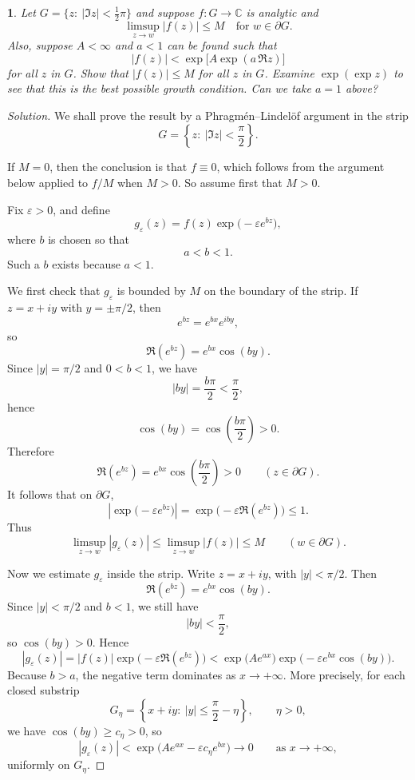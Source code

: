 \documentclass[12pt, a4paper]{report}
\theoremstyle{spaced}
\newtheorem{exercise}{}
\newcommand{\setexercise}[1]{\setcounter{exercise}{#1-1}}
\begin{document}
\setexercise{3}
\begin{exercise}
	Let $G=\{z:\ |\Im z|<\tfrac{1}{2}\pi\}$ and suppose $f:G\to\mathbb{C}$ is analytic and
	\[
		\limsup_{z\to w}|f(z)|\le M \quad \text{for } w\in \partial G.
	\]
	Also, suppose $A<\infty$ and $a<1$ can be found such that
	\[
		|f(z)|<\exp\!\bigl[A\exp(a\,\Re z)\bigr]
	\]
	for all $z$ in $G$. Show that $|f(z)|\le M$ for all $z$ in $G$.
	Examine $\exp(\exp z)$ to see that this is the best possible growth condition.
	Can we take $a=1$ above?
\end{exercise}
\begin{proof}[Solution]
	We shall prove the result by a Phragm\'en--Lindel\"of argument in the strip
	\[
		G=\left\{z:\ |\Im z|<\frac{\pi}{2}\right\}.
	\]

	If \(M=0\), then the conclusion is that \(f\equiv 0\), which follows from the argument below applied to \(f/M\) when \(M>0\). So assume first that \(M>0\).

	Fix \(\varepsilon>0\), and define
	\[
		g_\varepsilon(z)=f(z)\exp\!\bigl(-\varepsilon e^{bz}\bigr),
	\]
	where \(b\) is chosen so that
	\[
		a<b<1.
	\]
	Such a \(b\) exists because \(a<1\).

	We first check that \(g_\varepsilon\) is bounded by \(M\) on the boundary of the strip.
	If \(z=x+iy\) with \(y=\pm \pi/2\), then
	\[
		e^{bz}=e^{bx}e^{iby},
	\]
	so
	\[
		\Re(e^{bz})=e^{bx}\cos(by).
	\]
	Since \(|y|=\pi/2\) and \(0<b<1\), we have
	\[
		|by|=\frac{b\pi}{2}<\frac{\pi}{2},
	\]
	hence
	\[
		\cos(by)=\cos\!\left(\frac{b\pi}{2}\right)>0.
	\]
	Therefore
	\[
		\Re(e^{bz})=e^{bx}\cos\!\left(\frac{b\pi}{2}\right)>0
		\qquad (z\in \partial G).
	\]
	It follows that on \(\partial G\),
	\[
		\left|\exp\!\bigl(-\varepsilon e^{bz}\bigr)\right|
		=\exp\!\bigl(-\varepsilon \Re(e^{bz})\bigr)\le 1.
	\]
	Thus
	\[
		\limsup_{z\to w}|g_\varepsilon(z)|
		\le \limsup_{z\to w}|f(z)|
		\le M
		\qquad (w\in \partial G).
	\]

	Now we estimate \(g_\varepsilon\) inside the strip. Write \(z=x+iy\), with \(|y|<\pi/2\). Then
	\[
		\Re(e^{bz})=e^{bx}\cos(by).
	\]
	Since \(|y|<\pi/2\) and \(b<1\), we still have
	\[
		|by|<\frac{\pi}{2},
	\]
	so \(\cos(by)>0\). Hence
	\[
		|g_\varepsilon(z)|
		=
		|f(z)|\exp\!\bigl(-\varepsilon \Re(e^{bz})\bigr)
		<
		\exp\!\bigl(Ae^{ax}\bigr)\exp\!\bigl(-\varepsilon e^{bx}\cos(by)\bigr).
	\]
	Because \(b>a\), the negative term dominates as \(x\to +\infty\). More precisely, for each closed substrip
	\[
		G_\eta=\left\{x+iy:\ |y|\le \frac{\pi}{2}-\eta\right\},
		\qquad \eta>0,
	\]
	we have \(\cos(by)\ge c_\eta>0\), so
	\[
		|g_\varepsilon(z)|
		<
		\exp\!\bigl(Ae^{ax}-\varepsilon c_\eta e^{bx}\bigr)\to 0
		\qquad \text{as } x\to +\infty,
	\]
	uniformly on \(G_\eta\).


\end{proof}
\end{document}
